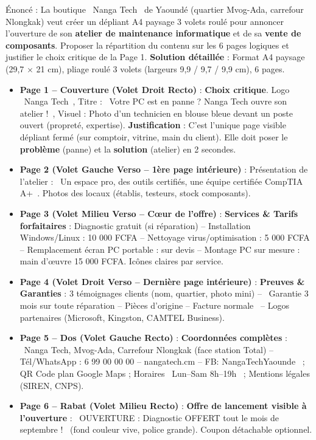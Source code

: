 \documentclass[11pt]{article}
\begin{document}
\begin{exoresolu}
Énoncé : La boutique \og~Nanga Tech~\fg{} de Yaoundé (quartier Mvog-Ada, carrefour Nlongkak) veut créer un dépliant A4 paysage 3 volets roulé pour annoncer l'ouverture de son \textbf{atelier de maintenance informatique} et de sa \textbf{vente de composants}. Proposer la répartition du contenu sur les 6 pages logiques et justifier le choix critique de la Page 1.
\tcblower
\textbf{Solution détaillée} : Format A4 paysage (29,7 $\times$ 21 cm), pliage roulé 3 volets (largeurs 9,9 / 9,7 / 9,9 cm), 6 pages.
\begin{itemize}
\item \textbf{Page 1 -- Couverture (Volet Droit Recto)} : \textbf{Choix critique}. Logo \og~Nanga Tech~\fg{}, Titre : \og~Votre PC est en panne ? Nanga Tech ouvre son atelier !~\fg{}, Visuel : Photo d'un technicien en blouse bleue devant un poste ouvert (propreté, expertise). \textbf{Justification} : C'est l'unique page visible dépliant fermé (sur comptoir, vitrine, main du client). Elle doit poser le \textbf{problème} (panne) et la \textbf{solution} (atelier) en 2 secondes.
\item \textbf{Page 2 (Volet Gauche Verso -- 1ère page intérieure)} : Présentation de l'atelier : \og~Un espace pro, des outils certifiés, une équipe certifiée CompTIA A+~\fg{}. Photos des locaux (établis, testeurs, stock composants).
\item \textbf{Page 3 (Volet Milieu Verso -- Cœur de l'offre)} : \textbf{Services \& Tarifs forfaitaires} : Diagnostic gratuit (si réparation) -- Installation Windows/Linux : 10 000 FCFA -- Nettoyage virus/optimisation : 5 000 FCFA -- Remplacement écran PC portable : sur devis -- Montage PC sur mesure : main d'œuvre 15 000 FCFA. Icônes claires par service.
\item \textbf{Page 4 (Volet Droit Verso -- Dernière page intérieure)} : \textbf{Preuves \& Garanties} : 3 témoignages clients (nom, quartier, photo mini) -- \og~Garantie 3 mois sur toute réparation -- Pièces d'origine -- Facture normale~\fg{} -- Logos partenaires (Microsoft, Kingston, CAMTEL Business).
\item \textbf{Page 5 -- Dos (Volet Gauche Recto)} : \textbf{Coordonnées complètes} : \og~Nanga Tech, Mvog-Ada, Carrefour Nlongkak (face station Total) -- Tél/WhatsApp : 6 99 00 00 00 -- nangatech.cm -- FB: NangaTechYaounde~\fg{} ; QR Code plan Google Maps ; Horaires \og~Lun--Sam 8h--19h~\fg{} ; Mentions légales (SIREN, CNPS).
\item \textbf{Page 6 -- Rabat (Volet Milieu Recto)} : \textbf{Offre de lancement visible à l'ouverture} : \og~OUVERTURE : Diagnostic OFFERT tout le mois de septembre !~\fg{} (fond couleur vive, police grande). Coupon détachable optionnel.

\end{itemize}
\end{exoresolu}
\end{document}
